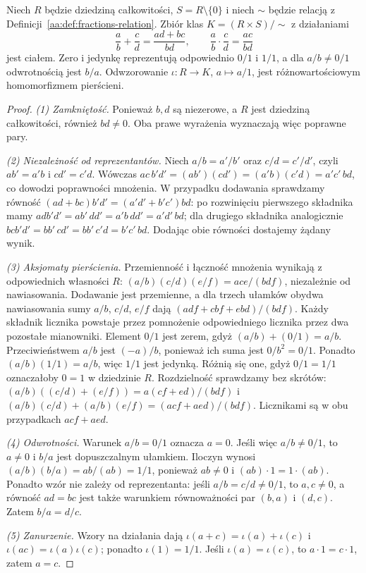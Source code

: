 \begin{twierdzenie}
\label{aa:tw:fractions-field}
Niech $R$ będzie dziedziną całkowitości,
$S=R\setminus\{0\}$ i niech $\sim$ będzie relacją
z Definicji~\ref{aa:def:fractions-relation}. Zbiór klas
$K=(R\times S)/{\sim}$ z działaniami
\[
 \frac ab+\frac cd=\frac{ad+bc}{bd},\qquad
 \frac ab\cdot\frac cd=\frac{ac}{bd}
\]
jest ciałem. Zero i jedynkę reprezentują odpowiednio
$0/1$ i $1/1$, a dla $a/b\ne0/1$ odwrotnością jest $b/a$.
Odwzorowanie $\iota:R\to K$, $a\mapsto a/1$,
jest różnowartościowym homomorfizmem pierścieni.
\end{twierdzenie}
\begin{proof}
\emph{(1) Zamkniętość.} Ponieważ $b,d$ są niezerowe,
a $R$ jest dziedziną całkowitości, również $bd\ne0$.
Oba prawe wyrażenia wyznaczają więc poprawne pary.

\emph{(2) Niezależność od reprezentantów.}
Niech $a/b=a'/b'$ oraz $c/d=c'/d'$,
czyli $ab'=a'b$ i $cd'=c'd$. Wówczas
$ac\,b'd'=(ab')(cd')=(a'b)(c'd)=a'c'\,bd$,
co dowodzi poprawności mnożenia.
W przypadku dodawania sprawdzamy równość
$(ad+bc)b'd'=(a'd'+b'c')bd$:
po rozwinięciu pierwszego składnika mamy
$ad b'd'=ab'\,dd'=a'b\,dd'=a'd'\,bd$;
dla drugiego składnika analogicznie
$bc b'd'=bb'\,cd'=bb'\,c'd=b'c'\,bd$.
Dodając obie równości dostajemy żądany wynik.

\emph{(3) Aksjomaty pierścienia.} Przemienność i łączność
mnożenia wynikają z odpowiednich własności $R$:
$(a/b)(c/d)(e/f)=ace/(bdf)$, niezależnie od nawiasowania.
Dodawanie jest przemienne, a dla trzech ułamków
obydwa nawiasowania sumy $a/b$, $c/d$, $e/f$ dają
$(adf+cbf+ebd)/(bdf)$. Każdy składnik licznika
powstaje przez pomnożenie odpowiedniego licznika
przez dwa pozostałe mianowniki. Element $0/1$ jest zerem, gdyż
$(a/b)+(0/1)=a/b$. Przeciwieństwem $a/b$
jest $(-a)/b$, ponieważ ich suma jest $0/b^2=0/1$.
Ponadto $(a/b)(1/1)=a/b$, więc $1/1$ jest jedynką.
Różnią się one, gdyż $0/1=1/1$ oznaczałoby $0=1$
w dziedzinie $R$.
Rozdzielność sprawdzamy bez skrótów:
$(a/b)((c/d)+(e/f))=a(cf+ed)/(bdf)$
i $(a/b)(c/d)+(a/b)(e/f)=(acf+aed)/(bdf)$.
Licznikami są w obu przypadkach $acf+aed$.

\emph{(4) Odwrotności.} Warunek $a/b=0/1$ oznacza $a=0$.
Jeśli więc $a/b\ne0/1$, to $a\ne0$ i $b/a$ jest
dopuszczalnym ułamkiem. Iloczyn wynosi
$(a/b)(b/a)=ab/(ab)=1/1$, ponieważ $ab\ne0$
i $(ab)\cdot1=1\cdot(ab)$.
Ponadto wzór nie zależy od reprezentanta: jeśli
$a/b=c/d\ne0/1$, to $a,c\ne0$, a równość
$ad=bc$ jest także warunkiem równoważności par
$(b,a)$ i $(d,c)$. Zatem $b/a=d/c$.

\emph{(5) Zanurzenie.} Wzory na działania dają
$\iota(a+c)=\iota(a)+\iota(c)$ i
$\iota(ac)=\iota(a)\iota(c)$; ponadto
$\iota(1)=1/1$. Jeśli $\iota(a)=\iota(c)$,
to $a\cdot1=c\cdot1$, zatem $a=c$.
\end{proof}


